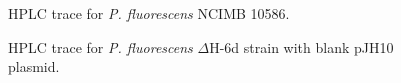 		\setlength\fboxsep{5pt}
		\setlength\fboxrule{1.5pt}
		\begin{figure}[htbp]
		\centering
		\caption[HPLC trace for \textit{P. fluorescens} NCIMB 10586. ]{HPLC trace for \textit{P. fluorescens} NCIMB 10586.}
		\label{fig:hplcwt}
		\end{figure}

		\setlength\fboxsep{5pt}
		\setlength\fboxrule{1.5pt}
		\begin{figure}[htbp]
		\centering
		\caption[HPLC trace for \textit{P. fluorescens} $ \Delta $H-6d strain with blank pJH10 plasmid. ]{HPLC trace for \textit{P. fluorescens} $ \Delta $H-6d strain with blank pJH10 plasmid.}
		\label{fig:hplcdeltahphj10}
		\end{figure}

